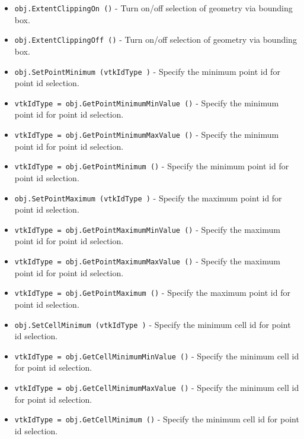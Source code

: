 \begin{itemize}
\item  \verb|obj.ExtentClippingOn ()| -  Turn on/off selection of geometry via bounding box.

\item  \verb|obj.ExtentClippingOff ()| -  Turn on/off selection of geometry via bounding box.

\item  \verb|obj.SetPointMinimum (vtkIdType )| -  Specify the minimum point id for point id selection.

\item  \verb|vtkIdType = obj.GetPointMinimumMinValue ()| -  Specify the minimum point id for point id selection.

\item  \verb|vtkIdType = obj.GetPointMinimumMaxValue ()| -  Specify the minimum point id for point id selection.

\item  \verb|vtkIdType = obj.GetPointMinimum ()| -  Specify the minimum point id for point id selection.

\item  \verb|obj.SetPointMaximum (vtkIdType )| -  Specify the maximum point id for point id selection.

\item  \verb|vtkIdType = obj.GetPointMaximumMinValue ()| -  Specify the maximum point id for point id selection.

\item  \verb|vtkIdType = obj.GetPointMaximumMaxValue ()| -  Specify the maximum point id for point id selection.

\item  \verb|vtkIdType = obj.GetPointMaximum ()| -  Specify the maximum point id for point id selection.

\item  \verb|obj.SetCellMinimum (vtkIdType )| -  Specify the minimum cell id for point id selection.

\item  \verb|vtkIdType = obj.GetCellMinimumMinValue ()| -  Specify the minimum cell id for point id selection.

\item  \verb|vtkIdType = obj.GetCellMinimumMaxValue ()| -  Specify the minimum cell id for point id selection.

\item  \verb|vtkIdType = obj.GetCellMinimum ()| -  Specify the minimum cell id for point id selection.


\end{itemize}
